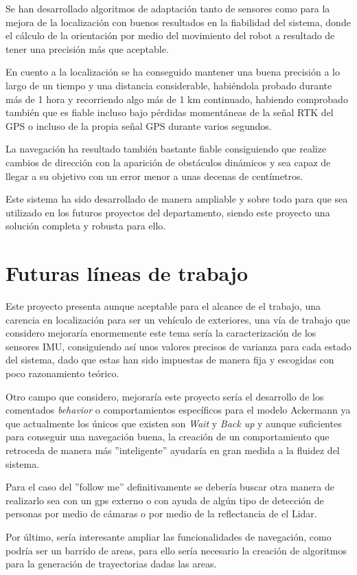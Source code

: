 Se han desarrollado algoritmos de adaptación tanto de sensores como para la mejora de la localización con buenos resultados en la fiabilidad del sistema, donde el cálculo 
de la orientación por medio del movimiento del robot a resultado de tener una precisión más que aceptable.

En cuento a la localización se ha conseguido mantener una buena precisión a lo largo de un tiempo y una distancia considerable, habiéndola probado durante más de 1 hora 
y recorriendo algo más de 1 km continuado, habiendo comprobado también
que es fiable incluso bajo pérdidas momentáneas de la señal RTK del GPS o incluso de la propia señal GPS durante varios segundos.

La navegación ha resultado también bastante fiable consiguiendo que realize cambios de dirección con la aparición de obstáculos dinámicos y sea capaz de 
llegar a su objetivo con un error menor a unas decenas de centímetros.

Este sistema ha sido desarrollado de manera ampliable y sobre todo para que sea utilizado en los futuros proyectos del departamento, 
siendo este proyecto una solución completa y robusta para ello.

\chapter{Futuras líneas de trabajo}

Este proyecto presenta aunque aceptable para el alcance de el trabajo, una carencia en localización para ser un vehículo de exteriores, 
una vía de trabajo que considero mejoraría enormemente este tema sería la caracterización de los sensores IMU, consiguiendo así unos 
valores precisos de varianza para cada estado del sistema, dado que estas han sido impuestas de manera fija y escogidas con poco 
razonamiento teórico.

Otro campo que considero, mejoraría este proyecto sería el desarrollo de los comentados \textit{behavior} o comportamientos específicos para 
el modelo Ackermann ya que actualmente los únicos que existen son \textit{Wait} y \textit{Back up} y aunque suficientes para conseguir una navegación buena,
la creación de un comportamiento que retroceda de manera más ''inteligente'' ayudaría en gran medida a la fluidez del sistema.

Para el caso del ''follow me'' definitivamente se debería buscar otra manera de realizarlo sea con un gps externo o con ayuda de algún tipo de 
detección de personas por medio de cámaras o por medio de la reflectancia de el Lidar.

Por último, sería interesante ampliar las funcionalidades de navegación, como podría ser un barrido de areas, para ello sería necesario 
la creación de algoritmos para la generación de trayectorias dadas las areas.